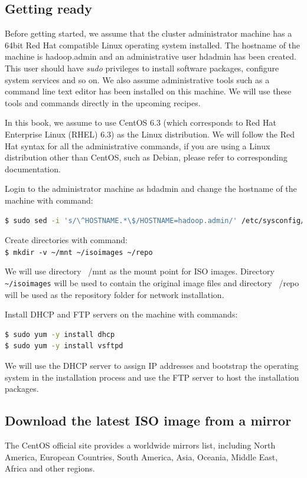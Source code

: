 \subsection*{Getting ready}
Before getting started, we assume that the cluster administrator machine has a 64bit Red Hat compatible Linux operating system installed. The hostname of the machine is hadoop.admin and an administrative user hdadmin has been created. This user should have \emph{sudo} privileges to install software packages, configure system services and so on. We also assume administrative tools such as a command line text editor has been installed on this machine. We will use these tools and commands directly in the upcoming recipes.

In this book, we assume to use CentOS 6.3 (which corresponds to Red Hat Enterprise Linux (RHEL) 6.3) as the Linux distribution. We will follow the Red Hat syntax for all the administrative commands, if you are using a Linux distribution other than CentOS, such as Debian, please refer to corresponding documentation.

Login to the administrator machine as hdadmin and change the hostname of the machine with command:
\lstset{style=bashstyle}
\begin{lstlisting}[language=bash]
$ sudo sed -i 's/\^HOSTNAME.*\$/HOSTNAME=hadoop.admin/' /etc/sysconfig/network
\end{lstlisting}
Create directories with command: \\
\verb|$ mkdir -v ~/mnt ~/isoimages ~/repo|

We will use directory ~/mnt as the mount point for ISO images. Directory \verb|~/isoimages| will be used to contain the original image files and directory ~/repo will be used as the repository folder for network installation.

Install DHCP and FTP servers on the machine with commands: 
\lstset{style=bashstyle}
\begin{lstlisting}[language=bash]
$ sudo yum -y install dhcp
$ sudo yum -y install vsftpd
\end{lstlisting}

We will use the DHCP server to assign IP addresses and bootstrap the operating system in the installation process and use the FTP server to host the installation packages.
\subsection*{Download the latest ISO image from a mirror}
The CentOS official site provides a worldwide mirrors list, including North America, European Countries, South America, Asia, Oceania, Middle East, Africa and other regions.

